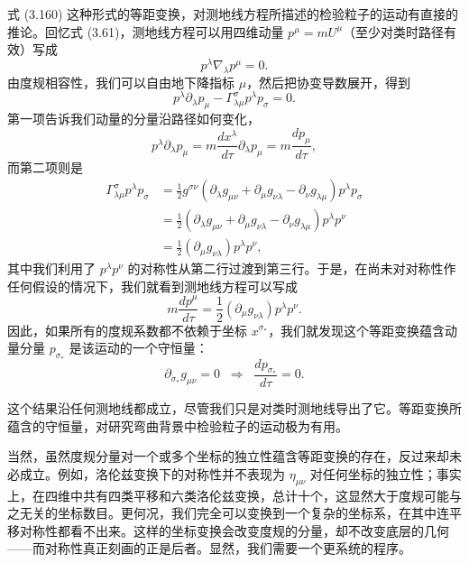 式 (3.160) 这种形式的等距变换，对测地线方程所描述的检验粒子的运动有直接的推论。回忆式 (3.61)，测地线方程可以用四维动量 $p^\mu = mU^\mu$（至少对类时路径有效）写成
\begin{equation*}
p^\lambda\nabla_\lambda p^\mu = 0.
\tag{3.161}
\end{equation*}
由度规相容性，我们可以自由地下降指标 $\mu$，然后把协变导数展开，得到
\begin{equation*}
p^\lambda\partial_\lambda p_\mu - \Gamma^\sigma_{\lambda\mu}p^\lambda p_\sigma = 0.
\tag{3.162}
\end{equation*}
第一项告诉我们动量的分量沿路径如何变化，
\begin{equation*}
p^\lambda\partial_\lambda p_\mu = m\frac{dx^\lambda}{d\tau}\partial_\lambda p_\mu = m\frac{dp_\mu}{d\tau},
\tag{3.163}
\end{equation*}
而第二项则是
\begin{align*}
\Gamma^\sigma_{\lambda\mu}p^\lambda p_\sigma &= \frac{1}{2}g^{\sigma\nu}(\partial_\lambda g_{\mu\nu} + \partial_\mu g_{\nu\lambda} - \partial_\nu g_{\lambda\mu})p^\lambda p_\sigma \tag{3.164}\\
&= \frac{1}{2}(\partial_\lambda g_{\mu\nu} + \partial_\mu g_{\nu\lambda} - \partial_\nu g_{\lambda\mu})p^\lambda p^\nu \tag{3.165}\\
&= \frac{1}{2}(\partial_\mu g_{\nu\lambda})p^\lambda p^\nu,
\tag{3.166}
\end{align*}
其中我们利用了 $p^\lambda p^\nu$ 的对称性从第二行过渡到第三行。于是，在尚未对对称性作任何假设的情况下，我们就看到测地线方程可以写成
\begin{equation*}
m\frac{dp^\mu}{d\tau} = \frac{1}{2}(\partial_\mu g_{\nu\lambda})p^\lambda p^\nu.
\tag{3.167}
\end{equation*}
因此，如果所有的度规系数都不依赖于坐标 $x^{\sigma_*}$，我们就发现这个等距变换蕴含动量分量 $p_{\sigma_*}$ 是该运动的一个守恒量：
\begin{equation*}
\partial_{\sigma_*}g_{\mu\nu} = 0 \;\;\Rightarrow\;\; \frac{dp_{\sigma_*}}{d\tau} = 0.
\tag{3.168}
\end{equation*}

这个结果沿任何测地线都成立，尽管我们只是对类时测地线导出了它。等距变换所蕴含的守恒量，对研究弯曲背景中检验粒子的运动极为有用。

当然，虽然度规分量对一个或多个坐标的独立性蕴含等距变换的存在，反过来却未必成立。例如，洛伦兹变换下的对称性并不表现为 $\eta_{\mu\nu}$ 对任何坐标的独立性；事实上，在四维中共有四类平移和六类洛伦兹变换，总计十个，这显然大于度规可能与之无关的坐标数目。更何况，我们完全可以变换到一个复杂的坐标系，在其中连平移对称性都看不出来。这样的坐标变换会改变度规的分量，却不改变底层的几何——而对称性真正刻画的正是后者。显然，我们需要一个更系统的程序。

